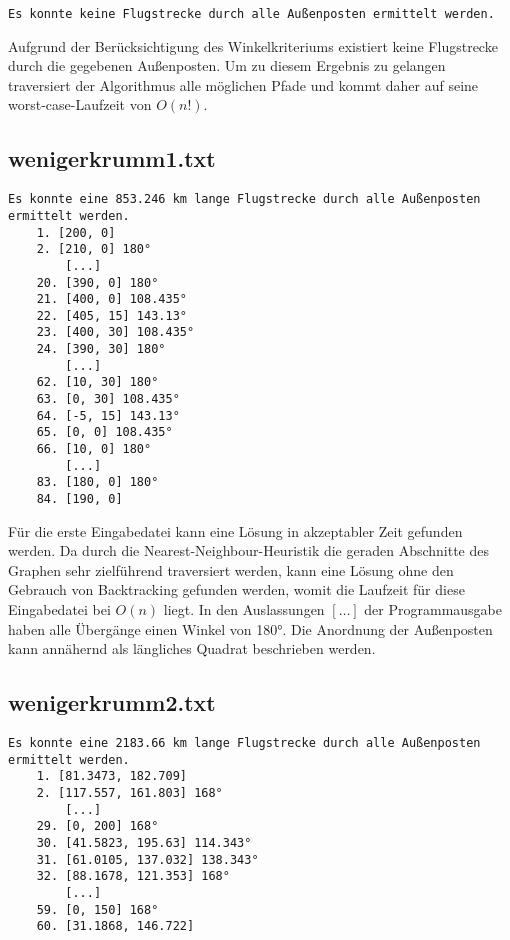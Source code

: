 \documentclass[a4paper,10pt,ngerman]{scrartcl}
\begin{document}
    \begin{lstlisting}[frame=single, title=Programmausgabe nicht\_loesbar.txt, breaklines=true,label={lst:lstlisting5}]
    Es konnte keine Flugstrecke durch alle Außenposten ermittelt werden.
    \end{lstlisting}

    Aufgrund der Berücksichtigung des Winkelkriteriums existiert keine Flugstrecke durch die gegebenen Außenposten.
    Um zu diesem Ergebnis zu gelangen traversiert der Algorithmus alle möglichen Pfade und kommt daher auf seine
    worst-case-Laufzeit von $O(n!)$.

    \subsection{wenigerkrumm1.txt}\label{subsec:wenigerkrumm1.txt}

    \begin{lstlisting}[frame=single, title=Programmausgabe wenigerkrumm1.txt, breaklines=true,label={lst:lstlisting6}]
    Es konnte eine 853.246 km lange Flugstrecke durch alle Außenposten ermittelt werden.
    1. [200, 0]
    2. [210, 0] 180°
        [...]
    20. [390, 0] 180°
    21. [400, 0] 108.435°
    22. [405, 15] 143.13°
    23. [400, 30] 108.435°
    24. [390, 30] 180°
        [...]
    62. [10, 30] 180°
    63. [0, 30] 108.435°
    64. [-5, 15] 143.13°
    65. [0, 0] 108.435°
    66. [10, 0] 180°
        [...]
    83. [180, 0] 180°
    84. [190, 0]
    \end{lstlisting}

    Für die erste Eingabedatei kann eine Lösung in akzeptabler Zeit gefunden werden.
    Da durch die Nearest-Neighbour-Heuristik die geraden Abschnitte des Graphen sehr zielführend traversiert werden,
    kann eine Lösung ohne den Gebrauch von Backtracking gefunden werden, womit die Laufzeit für diese Eingabedatei bei $O(n)$ liegt.
    In den Auslassungen $[\dots]$ der Programmausgabe haben alle Übergänge einen Winkel von 180°.
    Die Anordnung der Außenposten kann annähernd als längliches Quadrat beschrieben werden.

    \subsection{wenigerkrumm2.txt}\label{subsec:wenigerkrumm2.txt}

    \begin{lstlisting}[frame=single, title=Programmausgabe wenigerkrumm2.txt, breaklines=true,label={lst:lstlisting7}]
    Es konnte eine 2183.66 km lange Flugstrecke durch alle Außenposten ermittelt werden.
    1. [81.3473, 182.709]
    2. [117.557, 161.803] 168°
        [...]
    29. [0, 200] 168°
    30. [41.5823, 195.63] 114.343°
    31. [61.0105, 137.032] 138.343°
    32. [88.1678, 121.353] 168°
        [...]
    59. [0, 150] 168°
    60. [31.1868, 146.722]
    \end{lstlisting}
\end{document}
